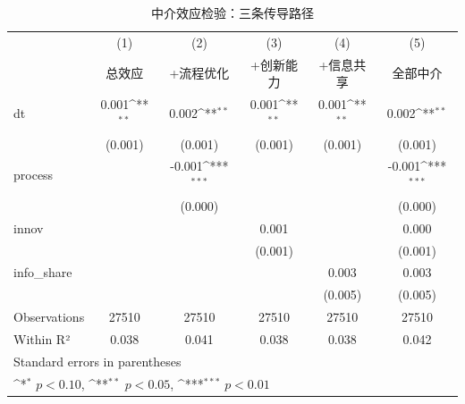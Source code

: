 \begin{table}[h!]\centering\scriptsize
\def\sym#1{\ifmmode^{#1}\else\(^{#1}\)\fi}
\caption{中介效应检验：三条传导路径}
\begin{tabular}{l*{5}{c}}
\hline\hline
            &\multicolumn{1}{c}{(1)}&\multicolumn{1}{c}{(2)}&\multicolumn{1}{c}{(3)}&\multicolumn{1}{c}{(4)}&\multicolumn{1}{c}{(5)}\\
            &\multicolumn{1}{c}{总效应}&\multicolumn{1}{c}{+流程优化}&\multicolumn{1}{c}{+创新能力}&\multicolumn{1}{c}{+信息共享}&\multicolumn{1}{c}{全部中介}\\
\hline
dt          &       0.001\sym{**} &       0.002\sym{**} &       0.001\sym{**} &       0.001\sym{**} &       0.002\sym{**} \\
            &     (0.001)         &     (0.001)         &     (0.001)         &     (0.001)         &     (0.001)         \\
process     &                     &      -0.001\sym{***}&                     &                     &      -0.001\sym{***}\\
            &                     &     (0.000)         &                     &                     &     (0.000)         \\
innov       &                     &                     &       0.001         &                     &       0.000         \\
            &                     &                     &     (0.001)         &                     &     (0.001)         \\
info\_share  &                     &                     &                     &       0.003         &       0.003         \\
            &                     &                     &                     &     (0.005)         &     (0.005)         \\
\hline
Observations&       27510         &       27510         &       27510         &       27510         &       27510         \\
Within R²   &       0.038         &       0.041         &       0.038         &       0.038         &       0.042         \\
\hline\hline
\multicolumn{6}{l}{\footnotesize Standard errors in parentheses}\\
\multicolumn{6}{l}{\footnotesize \sym{*} \(p<0.10\), \sym{**} \(p<0.05\), \sym{***} \(p<0.01\)}\\
\end{tabular}
\end{table}
